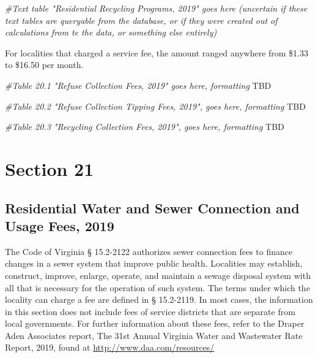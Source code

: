 \documentclass[
]{book}
\newenvironment{Shaded}{\begin{snugshade}}{\end{snugshade}}
\newcommand{\AlertTok}[1]{\textcolor[rgb]{0.94,0.16,0.16}{#1}}
\newcommand{\CommentTok}[1]{\textcolor[rgb]{0.56,0.35,0.01}{\textit{#1}}}
\begin{document}
\begin{Shaded}
\begin{Highlighting}[]
\CommentTok{\#Text table "Residential Recycling Programs, 2019" goes here (uncertain if these text tables are queryable from the database, or if they were created out of calculations from te the data, or something else entirely)}
\end{Highlighting}
\end{Shaded}

For localities that charged a service fee, the amount ranged anywhere from \$1.33 to \$16.50 per month.

\begin{Shaded}
\begin{Highlighting}[]
\CommentTok{\#Table 20.1 "Refuse Collection Fees, 2019" goes here, formatting }\AlertTok{TBD}

\CommentTok{\#Table 20.2 "Refuse Collection Tipping Fees, 2019", goes here, formatting }\AlertTok{TBD}

\CommentTok{\#Table 20.3 "Recycling Collection Fees, 2019", goes here, formatting }\AlertTok{TBD}
\end{Highlighting}
\end{Shaded}

\hypertarget{section-21}{%
\chapter{Section 21}\label{section-21}}

\hypertarget{residential-water-and-sewer-connection-and-usage-fees-2019}{%
\section{Residential Water and Sewer Connection and Usage Fees, 2019}\label{residential-water-and-sewer-connection-and-usage-fees-2019}}

The Code of Virginia § 15.2-2122 authorizes sewer connection fees to finance changes in a sewer system that improve public health. Localities may establish, construct, improve, enlarge, operate, and maintain a sewage disposal system with all that is necessary for the operation of such system. The terms under which the locality can charge a fee are defined in § 15.2-2119. In most cases, the information in this section does not include fees of service districts that are separate from local governments. For further information about these fees, refer to the Draper Aden Associates report, The 31st Annual Virginia Water and Wastewater Rate Report, 2019, found at \url{http://www.daa.com/resources/}
\end{document}
